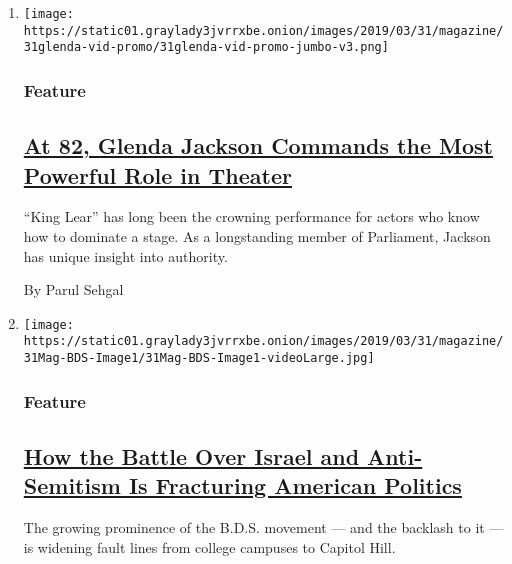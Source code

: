 \begin{enumerate}
\def\labelenumi{\arabic{enumi}.}
\item
  \texttt{[image: https://static01.graylady3jvrrxbe.onion/images/2019/03/31/magazine/31glenda-vid-promo/31glenda-vid-promo-jumbo-v3.png]}

  \hypertarget{feature}{%
  \subsubsection{Feature}\label{feature}}

  \hypertarget{at-82-glenda-jackson-commands-the-most-powerful-role-in-theater}{%
  \subsection{\texorpdfstring{\href{/2019/03/27/magazine/glenda-jackson-king-lear.html}{At
  82, Glenda Jackson Commands the Most Powerful Role in
  Theater}}{At 82, Glenda Jackson Commands the Most Powerful Role in Theater}}\label{at-82-glenda-jackson-commands-the-most-powerful-role-in-theater}}

  ``King Lear'' has long been the crowning performance for actors who
  know how to dominate a stage. As a longstanding member of Parliament,
  Jackson has unique insight into authority.

  By Parul Sehgal
\item
  \texttt{[image: https://static01.graylady3jvrrxbe.onion/images/2019/03/31/magazine/31Mag-BDS-Image1/31Mag-BDS-Image1-videoLarge.jpg]}

  \hypertarget{feature-1}{%
  \subsubsection{Feature}\label{feature-1}}

  \hypertarget{how-the-battle-over-israel-and-anti-semitism-is-fracturing-american-politics}{%
  \subsection{\texorpdfstring{\href{/2019/03/28/magazine/battle-over-bds-israel-palestinians-antisemitism.html}{How
  the Battle Over Israel and Anti-Semitism Is Fracturing American
  Politics}}{How the Battle Over Israel and Anti-Semitism Is Fracturing American Politics}}\label{how-the-battle-over-israel-and-anti-semitism-is-fracturing-american-politics}}

  The growing prominence of the B.D.S. movement --- and the backlash to
  it --- is widening fault lines from college campuses to Capitol Hill.


\end{enumerate}
